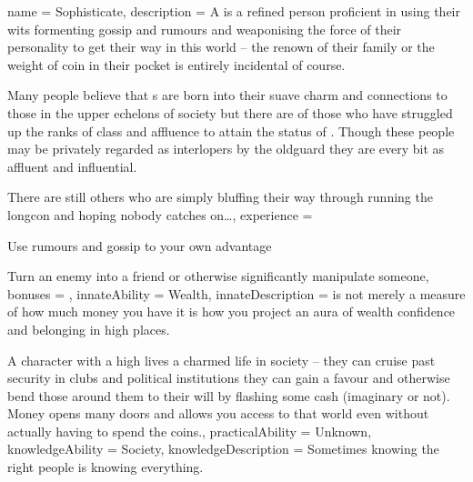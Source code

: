 \archetype
{
	name = Sophisticate,
	description = A \bname{} is a refined person\comma{} proficient in using their wits\comma{} formenting gossip and rumours\comma{} and weaponising the force of their personality to get their way in this world – the renown of their family\comma{} or the weight of coin in their pocket is entirely incidental\comma{} of course. 

Many people believe that \name{}s are born into their suave\comma{} charm and connections to those in the upper echelons of society\comma{} but there are of those who have struggled up the ranks of class and affluence to attain the status of \bname{}. Though these people may be privately regarded as interlopers by the old\minus{}guard\comma{} they are every bit as affluent and influential. 

There are still others who are simply bluffing their way through\comma{} running the long\minus{}con and hoping nobody catches on…,
	experience = \item Use rumours and gossip to your own advantage
\item Turn an enemy into a friend\comma{} or otherwise significantly manipulate someone,
	bonuses = 
,
	innateAbility = Wealth,
	innateDescription =  is not merely a measure of how much money you have\comma{} it is how you project an aura of wealth\comma{} confidence and belonging in high places. 

A character with a high  lives a charmed life in society – they can cruise past security in clubs and political institutions\comma{} they can gain a favour and otherwise bend those around them to their will by flashing some cash (imaginary or not). Money opens many doors\comma{} and  allows you access to that world\comma{} even without actually having to spend the coins.,
	practicalAbility = Unknown,
	knowledgeAbility = Society,
	knowledgeDescription = Sometimes\comma{} knowing the right people is knowing everything. 

}
